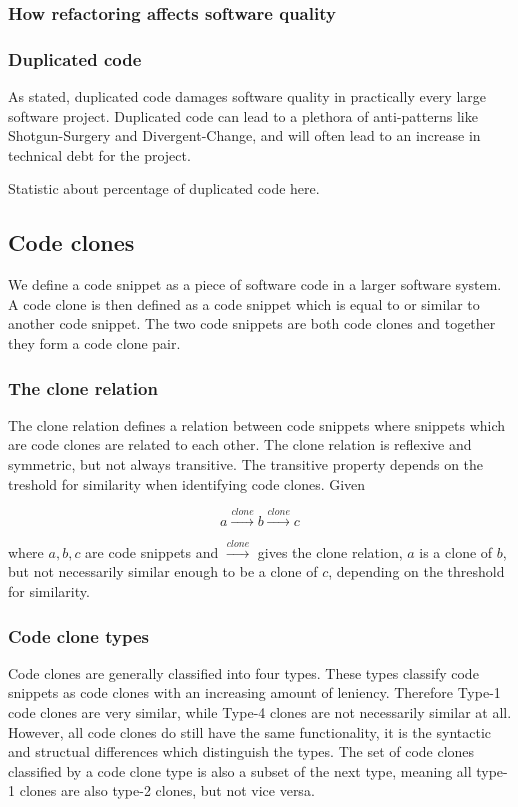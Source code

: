 \documentclass[12pt]{article}
\begin{document}
\subsubsection{How refactoring affects software quality}

\subsubsection{Duplicated code}

As stated, duplicated code damages software quality in practically every large software
project. Duplicated code can lead to a plethora of anti-patterns like Shotgun-Surgery and
Divergent-Change, and will often lead to an increase in technical debt for the
project.\cite[99]{fowlerrefactoring}

Statistic about percentage of duplicated code here.

\subsection{Code clones}

We define a code snippet as a piece of software code in a larger software system. A code
clone is then defined as a code snippet which is equal to or similar to another code
snippet. The two code snippets are both code clones and together they form a code clone
pair. 

\subsubsection{The clone relation}
The clone relation defines a relation between code snippets where snippets which are
code clones are related to each other. The clone relation is reflexive and symmetric, but
not always transitive. The transitive property depends on the treshold for similarity when
identifying code clones. Given

$$a \xrightarrow{clone} b \xrightarrow{clone} c$$

where $a,b,c$ are code snippets and $\xrightarrow{clone}$ gives the clone relation, $a$ is
a clone of $b$, but not necessarily similar enough to be a clone of $c$, depending on the
threshold for similarity.

\subsubsection{Code clone types}

Code clones are generally classified into four types.\cite{Inoue_introduction_to_cc} These
types classify code snippets as code clones with an increasing amount of leniency.
Therefore Type-1 code clones are very similar, while Type-4 clones are not necessarily
similar at all. However, all code clones do still have the same functionality, it is the
syntactic and structual differences which distinguish the types. The set of code clones
classified by a code clone type is also a subset of the next type, meaning all type-1
clones are also type-2 clones, but not vice versa.
\end{document}
